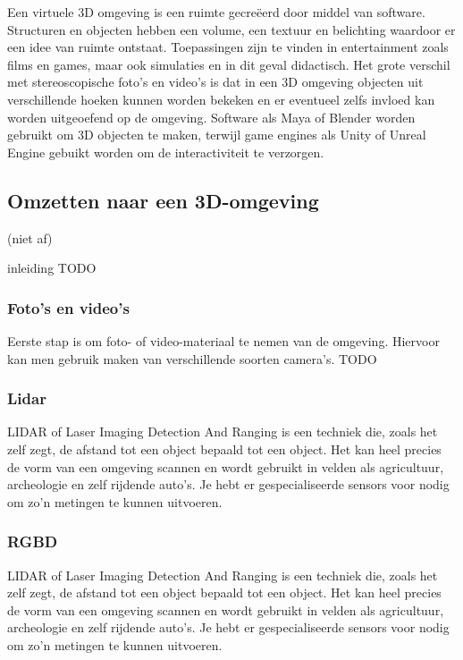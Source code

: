 Een virtuele 3D omgeving is een ruimte gecreëerd door middel van software. Structuren en objecten hebben een volume, een textuur en belichting waardoor er een idee van ruimte ontstaat. Toepassingen zijn te vinden in entertainment zoals films en games, maar ook simulaties en in dit geval didactisch. Het grote verschil met stereoscopische foto’s en video’s is dat in een 3D omgeving objecten uit verschillende hoeken kunnen worden bekeken en er eventueel zelfs invloed kan worden uitgeoefend op de omgeving. Software als Maya of Blender worden gebruikt om 3D objecten te maken, terwijl game engines als Unity of Unreal Engine gebuikt worden om de interactiviteit te verzorgen.



\subsection{Omzetten naar een 3D-omgeving} (niet af)

inleiding TODO

\subsubsection{Foto's en video's}
Eerste stap is om foto- of video-materiaal te nemen van de omgeving. Hiervoor kan men gebruik maken van verschillende soorten camera's. TODO

\subsubsection{Lidar}

LIDAR of Laser Imaging Detection And Ranging is een techniek die, zoals het zelf zegt, de afstand tot een object bepaald tot een object. Het kan heel precies de vorm van een omgeving scannen en wordt gebruikt in velden als agricultuur, archeologie en zelf rijdende auto’s. Je hebt er gespecialiseerde sensors voor nodig om zo’n metingen te kunnen uitvoeren.

\subsubsection{RGBD}

LIDAR of Laser Imaging Detection And Ranging is een techniek die, zoals het zelf zegt, de afstand tot een object bepaald tot een object. Het kan heel precies de vorm van een omgeving scannen en wordt gebruikt in velden als agricultuur, archeologie en zelf rijdende auto’s. Je hebt er gespecialiseerde sensors voor nodig om zo’n metingen te kunnen uitvoeren.

